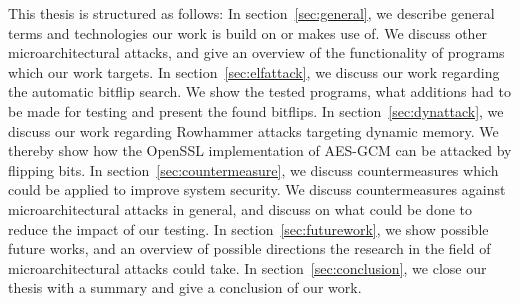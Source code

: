 This thesis is structured as follows: In section~\ref{sec:general}, we describe
general terms and technologies our work is build on or makes use of. We discuss
other microarchitectural attacks, and give an overview of the functionality of
programs which our work targets. In section~\ref{sec:elfattack}, we discuss our
work regarding the automatic bitflip search. We show the tested programs, what
additions had to be made for testing and present the found bitflips. In
section~\ref{sec:dynattack}, we discuss our work regarding Rowhammer attacks
targeting dynamic memory. We thereby show how the OpenSSL implementation of
AES-GCM can be attacked by flipping bits. In section~\ref{sec:countermeasure},
we discuss countermeasures which could be applied to improve system security. We
discuss countermeasures against microarchitectural attacks in general, and
discuss on what could be done to reduce the impact of our testing. In
section~\ref{sec:futurework}, we show possible future works, and an overview of
possible directions the research in the field of microarchitectural attacks
could take. In section~\ref{sec:conclusion}, we close our thesis with a summary
and give a conclusion of our work.

